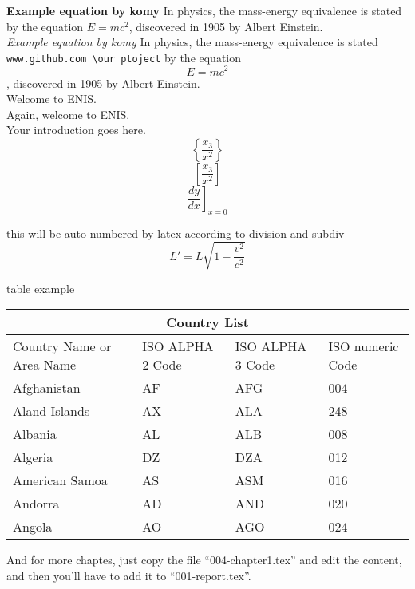   

\textbf{Example equation by komy} In physics, the mass-energy equivalence is stated 
by the equation $E=mc^2$, discovered in 1905 by Albert Einstein.\\
\textit{Example equation by komy} In physics, the mass-energy equivalence is stated 
\texttt{www.github.com \textbackslash our ptoject}
by the equation $$E=mc^2$$, discovered in 1905 by Albert Einstein.\\
Welcome to \Ac{ENIS}.~\\
Again, welcome to \Ac{ENIS}. ~\\
Your introduction goes here. ~\\

$$\left\{\frac{x_3}{x^2}\right\}$$
$$\left[\frac{x_3}{x^2}\right]$$
$$\left.\frac{d y}{d x}\right]_{x=0}$$

this will be auto numbered by latex according to division and subdiv
\begin{equation}
L' = {L}{\sqrt{1-\frac{v^2}{c^2}}}
\end{equation}



table example\\
\begin{center}

\begin{tabular}{ |p{3cm}||p{3cm}|p{3cm}|p{3cm}|  }
 \hline
 \multicolumn{4}{|c|}{Country List} \\
 \hline
 
 Country Name     or Area Name& ISO ALPHA 2 Code &ISO ALPHA 3 Code&ISO numeric Code\\
 \hline
 Afghanistan   & AF    &AFG&   004\\
 Aland Islands&   AX  & ALA   &248\\
 Albania &AL & ALB&  008\\
 Algeria    &DZ & DZA&  012\\
 American Samoa&   AS  & ASM&016\\
 Andorra& AD  & AND   &020\\
 Angola& AO  & AGO&024\\
 \hline
\end{tabular}

\end{center}
And for more chaptes, just copy the file ``004-chapter1.tex'' and edit the content, and then you'll have to add it to ``001-report.tex''.
